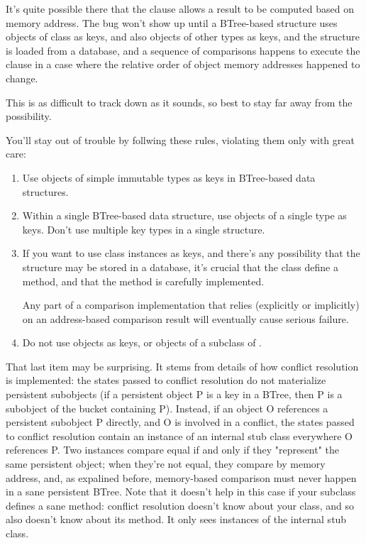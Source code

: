 It's quite possible there that the  clause allows
a result to be computed based on memory address.  The bug won't show
up until a BTree-based structure uses objects of class  as
keys, and also objects of other types as keys, and the structure is
loaded from a database, and a sequence of comparisons happens to execute
the  clause in a case where the relative order of object
memory addresses happened to change.

This is as difficult to track down as it sounds, so best to stay far
away from the possibility.

You'll stay out of trouble by follwing these rules, violating them
only with great care:

\begin{enumerate}
\item  Use objects of simple immutable types as keys in
       BTree-based data structures.

\item  Within a single BTree-based data structure, use objects of
       a single type as keys.  Don't use multiple key types in a
       single structure.

\item  If you want to use class instances as keys, and there's
       any possibility that the structure may be stored in a
       database, it's crucial that the class define a
        method, and that the method is
       carefully implemented.

       Any part of a comparison implementation that relies (explicitly
       or implicitly) on an address-based comparison result will
       eventually cause serious failure.

\item  Do not use  objects as keys, or objects of a
       subclass of .
\end{enumerate}

That last item may be surprising.  It stems from details of how
conflict resolution is implemented:  the states passed to conflict
resolution do not materialize persistent subobjects (if a persistent
object P is a key in a BTree, then P is a subobject of the bucket
containing P).  Instead, if an object O references a persistent subobject
P directly, and O is involved in a conflict, the states passed to
conflict resolution contain an instance of an internal
 stub class everywhere O references P.
Two  instances compare equal if and only if
they "represent" the same persistent object; when they're not equal,
they compare by memory address, and, as expalined before, memory-based
comparison must never happen in a sane persistent BTree.  Note that it
doesn't help in this case if your  subclass defines
a sane  method:  conflict resolution doesn't know
about your class, and so also doesn't know about its 
method.  It only sees instances of the internal 
stub class.


